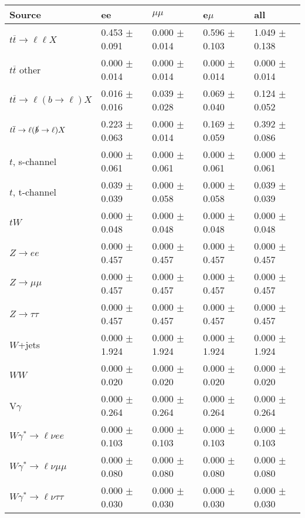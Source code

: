 \begin{tabular}{l | l l l l}
\hline\hline
 Source  &  ee  &  $\mu\mu$  &  e$\mu$  &  all \\
\hline
$t\overline{t}\rightarrow \ell\ell X$ &  0.453 $\pm$  0.091 &  0.000 $\pm$  0.014 &  0.596 $\pm$  0.103 &  1.049 $\pm$  0.138\\
$t\overline{t}$ other &  0.000 $\pm$  0.014 &  0.000 $\pm$  0.014 &  0.000 $\pm$  0.014 &  0.000 $\pm$  0.014\\
$t\overline{t}\rightarrow \ell(b\rightarrow \ell)X$ &  0.016 $\pm$  0.016 &  0.039 $\pm$  0.028 &  0.069 $\pm$  0.040 &  0.124 $\pm$  0.052\\
$t\overline{t}\rightarrow \ell(\slashed{b}\rightarrow \ell)X$ &  0.223 $\pm$  0.063 &  0.000 $\pm$  0.014 &  0.169 $\pm$  0.059 &  0.392 $\pm$  0.086\\
\hline
$t$, s-channel &  0.000 $\pm$  0.061 &  0.000 $\pm$  0.061 &  0.000 $\pm$  0.061 &  0.000 $\pm$  0.061\\
$t$, t-channel &  0.039 $\pm$  0.039 &  0.000 $\pm$  0.058 &  0.000 $\pm$  0.058 &  0.039 $\pm$  0.039\\
$tW$ &  0.000 $\pm$  0.048 &  0.000 $\pm$  0.048 &  0.000 $\pm$  0.048 &  0.000 $\pm$  0.048\\
\hline
$Z\rightarrow ee$ &  0.000 $\pm$  0.457 &  0.000 $\pm$  0.457 &  0.000 $\pm$  0.457 &  0.000 $\pm$  0.457\\
$Z\rightarrow\mu\mu$ &  0.000 $\pm$  0.457 &  0.000 $\pm$  0.457 &  0.000 $\pm$  0.457 &  0.000 $\pm$  0.457\\
$Z\rightarrow\tau\tau$ &  0.000 $\pm$  0.457 &  0.000 $\pm$  0.457 &  0.000 $\pm$  0.457 &  0.000 $\pm$  0.457\\
$W$+jets &  0.000 $\pm$  1.924 &  0.000 $\pm$  1.924 &  0.000 $\pm$  1.924 &  0.000 $\pm$  1.924\\
$WW$ &  0.000 $\pm$  0.020 &  0.000 $\pm$  0.020 &  0.000 $\pm$  0.020 &  0.000 $\pm$  0.020\\
\hline
V$\gamma$ &  0.000 $\pm$  0.264 &  0.000 $\pm$  0.264 &  0.000 $\pm$  0.264 &  0.000 $\pm$  0.264\\
$W\gamma^{*}\rightarrow\ell\nu e e$ &  0.000 $\pm$  0.103 &  0.000 $\pm$  0.103 &  0.000 $\pm$  0.103 &  0.000 $\pm$  0.103\\
$W\gamma^{*}\rightarrow\ell\nu\mu\mu$ &  0.000 $\pm$  0.080 &  0.000 $\pm$  0.080 &  0.000 $\pm$  0.080 &  0.000 $\pm$  0.080\\
$W\gamma^{*}\rightarrow\ell\nu\tau\tau$ &  0.000 $\pm$  0.030 &  0.000 $\pm$  0.030 &  0.000 $\pm$  0.030 &  0.000 $\pm$  0.030\\

\end{tabular}

